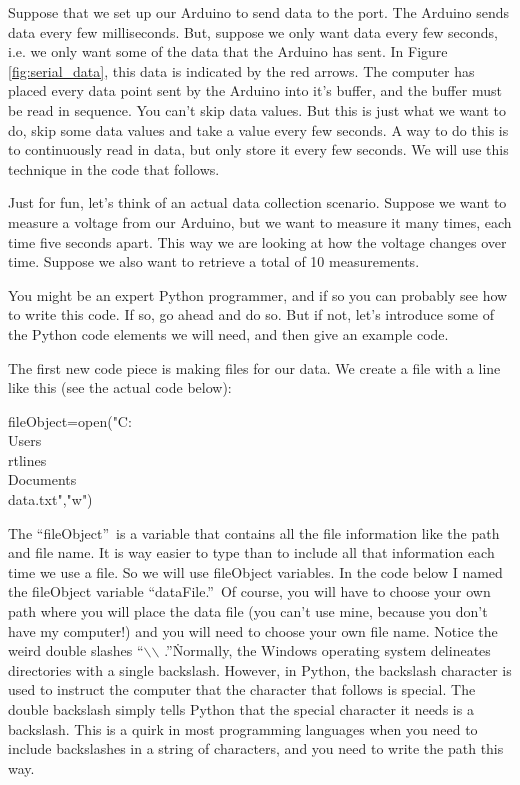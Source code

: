 Suppose that we set up our Arduino to send data to the port. The Arduino
sends data every few milliseconds. But, suppose we only want data every few
seconds, i.e. we only want some of the data that the Arduino has 
sent. In Figure \ref{fig:serial_data}, this data is indicated by the red 
arrows.
The computer has placed every data point sent by the Arduino into it's
buffer, and the buffer must be read in sequence. You can't skip data values.
But this is just what we want to do, skip some data values and take a value
every few seconds. A way to do this is to continuously read in data, but
only store it every few seconds. We will use this technique in the code that
follows.

Just for fun, let's think of an actual data collection scenario. 
Suppose we want to
measure a voltage from our Arduino, but we want to measure it many times,
each time five seconds apart. This way we are looking at how the voltage
changes over time. Suppose we also want to retrieve a total of 10 measurements.

You might be an expert Python programmer, and if so you can probably see how
to write this code. If so, go ahead and do so. But if not, let's introduce
some of the Python code elements we will need, and then give an example code.

The first new code piece is making files for our data. We create a file with
a line like this (see the actual code below):%

\begin{python}
	fileObject=open("C:\\Users\\rtlines\\Documents\\data.txt","w")	
\end{python}

The \textquotedblleft fileObject\textquotedblright\ is a variable that contains 
all the file information like the path and file name. It is way easier to type 
than to include all that information each time we use a file. So we will use 
fileObject variables. In the code below I named the fileObject variable 
\textquotedblleft dataFile.\textquotedblright\ Of course, you will have to 
choose your own path where you will place the data file (you can't use mine, 
because you don't have my computer!) and you will need to choose your own file 
name. Notice the weird double slashes
\textquotedblleft $\backslash$$\backslash$%
.\textquotedblright\. Normally, the Windows operating system delineates
directories with a single backslash. However, in Python, the backslash
character is used to instruct the computer that the character that follows is
special. The double backslash simply tells Python that the special character
it needs is a backslash. This is a quirk in most programming languages when you
need to include backslashes in a string of characters, and you need to write 
the path 
this way.

